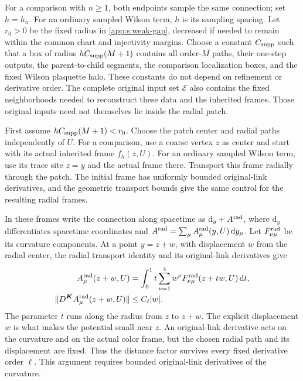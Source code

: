 \documentclass[11pt,a4paper]{article}
\theoremstyle{remark}
\newcommand{\dd}{\mathrm d}
\begin{document}
For a comparison with $n\ge1$, both endpoints sample the same
connection; set $h=h_n$. For an ordinary sampled Wilson term, $h$
is its sampling spacing. Let $r_0>0$ be the fixed radius in
\eqref{app:s:weak-gap}, decreased if needed to remain within the
common chart and injectivity margins. Choose a constant
$C_{\rm supp}$ such that a box of radius
$hC_{\rm supp}(M+1)$ contains all order-$M$ paths, their one-step
outputs, the parent-to-child segments, the comparison localization
boxes, and the fixed Wilson plaquette halo. These constants do not depend on refinement or
derivative order. The complete original input set $\mathcal E$ also
contains the fixed neighborhoods needed to reconstruct these data and
the inherited frames. Those original inputs need not themselves lie
inside the radial patch.

First assume $hC_{\rm supp}(M+1)<r_0$. Choose the patch center
and radial paths independently of $U$. For a comparison, use a coarse
vertex $z$ as center and start with its actual inherited frame
$f_h(z,U)$. For an ordinary sampled Wilson term, use its trace site
$z=y$ and the actual frame there. Transport this frame radially through
the patch. The initial frame has uniformly bounded original-link
derivatives, and the geometric transport bounds give the same control
for the resulting radial frames.

In these frames write the connection along spacetime as
$\dd_y+A^{\rm rad}$, where $\dd_y$ differentiates spacetime
coordinates and
$A^{\rm rad}=\sum_\mu A_\mu^{\rm rad}(y,U)\,\dd y_\mu$.
Let $F^{\rm rad}_{\nu\mu}$ be its curvature components. At a
point $y=z+w$, with displacement $w$ from the radial center, the
radial transport identity and its original-link derivatives give
\begin{equation}
 \begin{split}
 A^{\rm rad}_\mu(z+w,U)
  &=\int_0^1t\sum_{\nu=1}^4 w^\nu
          F^{\rm rad}_{\nu\mu}(z+tw,U)\,\dd t,\\
 \|D^{\boldsymbol K}A^{\rm rad}_\mu(z+w,U)\|
  &\le C_\ell|w|.
 \end{split}
 \label{app:a:weak-jets}
\end{equation}
The parameter $t$ runs along the radius from $z$ to $z+w$.
The explicit displacement $w$ is what makes the potential small near
$z$. An original-link derivative acts on the curvature and on the
actual color frame, but the chosen radial path and its displacement
are fixed. Thus the distance factor survives every fixed derivative
order $\ell$. This argument requires bounded original-link derivatives
of the curvature.
\end{document}
